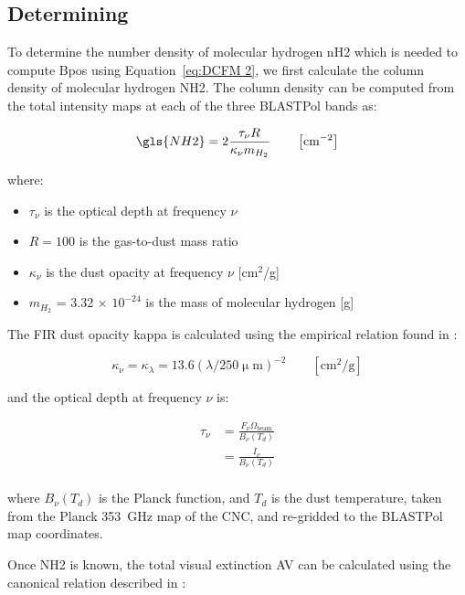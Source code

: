 \subsection{Determining }\label{nh2}

To determine the number density of molecular hydrogen \gls{nH2} which is needed to compute \gls{Bpos} using Equation~\ref{eq:DCFM 2}, we first calculate the column density of molecular hydrogen \gls{NH2}. The column density can be computed from the total intensity maps at each of the three BLASTPol bands as:

\begin{equation}\label{eq:NH2}
  \gls{NH2} = 2\frac{ \tau_{\nu} R}{\kappa_{\nu} m_{H_2}} \qquad \left[ \text{cm}^{-2} \right]
\end{equation}

where:
\begin{itemize}[label={},nosep]
  \item $\tau_{\nu}$ is the optical depth at frequency $\nu$
  \item $R = 100$ is the gas-to-dust mass ratio
  \item $\kappa_{\nu}$ is the dust opacity at frequency $\nu$ [cm$^{2}$/g]
  \item $m_{H_2}$ = 3.32 $\times$ $10^{-24}$ is the mass of molecular hydrogen [g]
\end{itemize}

The FIR dust opacity \gls{kappa} is calculated using the empirical relation found in \citet{mathis1990interstellar}:

\begin{equation}\label{eq:kappa}
  \kappa_{\nu} = \kappa_{\lambda} = 13.6 (\lambda / 250 \mathrm{\upmu m})^{-2} \qquad \left[ \mathrm{cm}^{2}/\mathrm{g} \right]
\end{equation}

and the optical depth at frequency $\nu$ is:

\begin{align}\label{eq:tau}
  \tau_{\nu} &= \frac{F_{\nu}\Omega_{\mathrm{beam}}}{B_{\nu}(T_{d})} \\
          &= \frac{I_{\nu}}{B_{\nu}(T_{d})} \\
\end{align}

where $B_{\nu}(T_{d})$ is the Planck function, and $T_{d}$ is the dust temperature, taken from the Planck 353~GHz map of the CNC, and re-gridded to the BLASTPol map coordinates.

Once \gls{NH2} is known, the total visual extinction \gls{AV} can be calculated using the canonical relation described in \citet{bohlin224savage}:


